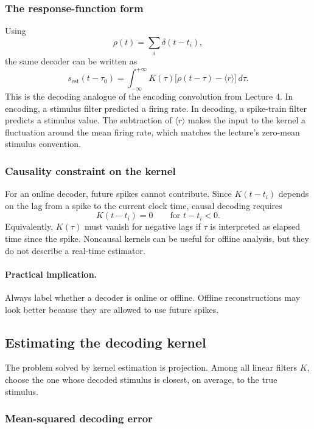 \subsubsection{The response-function form}

Using
\[
    \rho(t)=\sum_i \delta(t-t_i),
\]
the same decoder can be written as
\[
    s_{\mathrm{est}}(t-\tau_0)
    =
    \int_{-\infty}^{+\infty}K(\tau)
    \bigl[\rho(t-\tau)-\langle r\rangle\bigr]\,d\tau .
\]
This is the decoding analogue of the encoding convolution from Lecture 4. In encoding, a stimulus filter predicted a firing rate. In decoding, a spike-train filter predicts a stimulus value. The subtraction of $\langle r\rangle$ makes the input to the kernel a fluctuation around the mean firing rate, which matches the lecture's zero-mean stimulus convention.

\subsubsection{Causality constraint on the kernel}

For an online decoder, future spikes cannot contribute. Since $K(t-t_i)$ depends on the lag from a spike to the current clock time, causal decoding requires
\[
    K(t-t_i)=0 \qquad \text{for } t-t_i<0.
\]
Equivalently, $K(\tau)$ must vanish for negative lags if $\tau$ is interpreted as elapsed time since the spike. Noncausal kernels can be useful for offline analysis, but they do not describe a real-time estimator.

\paragraph{Practical implication.}
Always label whether a decoder is online or offline. Offline reconstructions may look better because they are allowed to use future spikes.

\subsection{Estimating the decoding kernel}

The problem solved by kernel estimation is projection. Among all linear filters $K$, choose the one whose decoded stimulus is closest, on average, to the true stimulus.

\subsubsection{Mean-squared decoding error}

